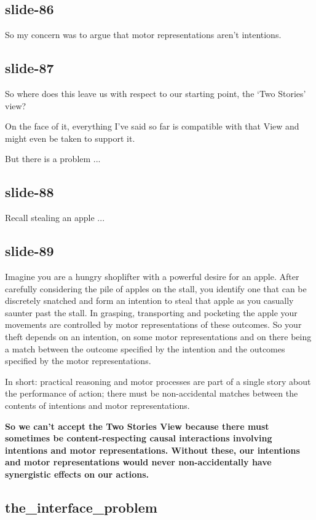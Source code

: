 \documentclass[12pt,\papersize]{extarticle}
\begin{document}
\subsection{slide-86}
So my concern was to argue that motor representations aren’t intentions.
 
\subsection{slide-87}
So where does this leave us with respect to our starting point,
the ‘Two Stories’ view?
 
On the face of it, everything I’ve said so far is compatible with that View
and might even be taken to support it.
 
But there is a problem ...
 
\subsection{slide-88}
Recall stealing an apple ...
 
\subsection{slide-89}
Imagine you are a hungry shoplifter with a powerful desire for an apple. After carefully
considering the pile of apples on the stall, you identify one that can be discretely
snatched and form an intention to steal that apple as you casually saunter past the stall.
In grasping, transporting and pocketing the apple your movements are controlled by motor
representations of these outcomes. So your theft depends on an intention, on some motor
representations and on there being a match between the outcome specified by the intention
and the outcomes specified by the motor representations.
 
In short: practical reasoning and motor processes are part of a single story about the
performance of action; there must be non-accidental matches between the contents of
intentions and motor representations.
 
\textbf{So we can’t accept the Two Stories View because there must sometimes be content-respecting
causal interactions involving intentions and motor representations.
Without these, our intentions and motor representations would never non-accidentally
have synergistic effects on our actions.}
 
\subsection{the\_interface\_problem}
 
\end{document}
